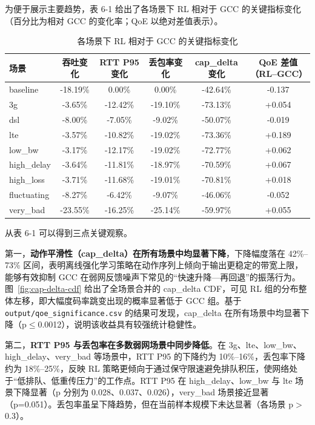 为便于展示主要趋势，表 6-1 给出了各场景下 RL 相对于 GCC 的关键指标变化（百分比为相对 GCC 的变化率；QoE 以绝对差值表示）。

\begin{table}[htbp]
    \centering
    \small
    \begin{tabular}{|l|c|c|c|c|c|}
        \hline
        场景 & 吞吐变化 & RTT P95 变化 & 丢包率变化 & cap\_delta 变化 & QoE 差值（RL--GCC） \\
        \hline
        baseline & -18.19\% & 0.00\% & 0.00\% & -42.64\% & -0.137 \\
        3g & -3.65\% & -12.42\% & -19.10\% & -73.13\% & +0.054 \\
        dsl & -8.00\% & -7.05\% & -9.02\% & -50.07\% & -0.019 \\
        lte & -3.57\% & -10.82\% & -19.02\% & -73.36\% & +0.189 \\
        low\_bw & -3.17\% & -12.17\% & -19.02\% & -72.77\% & +0.062 \\
        high\_delay & -3.64\% & -11.81\% & -18.97\% & -70.59\% & +0.067 \\
        high\_loss & -3.71\% & -11.68\% & -19.01\% & -70.81\% & +0.018 \\
        fluctuating & -8.27\% & -6.42\% & -9.07\% & -46.06\% & -0.052 \\
        very\_bad & -23.55\% & -16.25\% & -25.14\% & -59.97\% & +0.055 \\
        \hline
    \end{tabular}
    \caption{各场景下 RL 相对于 GCC 的关键指标变化}
    \label{tab:ab-delta-summary}
\end{table}

从表 6-1 可以得到三点关键观察。

第一，\textbf{动作平滑性（cap\_delta）在所有场景中均显著下降}，下降幅度落在 42\%--73\% 区间，表明离线强化学习策略在动作序列上倾向于输出更稳定的带宽上限，能够有效抑制 GCC 在弱网反馈噪声下常见的“快速升降—再回退”的振荡行为。图~\ref{fig:cap-delta-cdf} 给出了全场景合并的 cap\_delta CDF，可见 RL 组的分布整体左移，即大幅度码率跳变出现的概率显著低于 GCC 组。基于 \texttt{output/qoe\_significance.csv} 的结果可发现，cap\_delta 在所有场景中均显著下降（p$\le$0.0012），说明该收益具有较强统计稳健性。

第二，\textbf{RTT P95 与丢包率在多数弱网场景中同步降低}。在 3g、lte、low\_bw、high\_delay、very\_bad 等场景中，RTT P95 的下降约为 10\%--16\%，丢包率下降约为 18\%--25\%，反映 RL 策略更倾向于通过保守限速避免排队积压，使网络处于“低排队、低重传压力”的工作点。RTT P95 在 high\_delay、low\_bw 与 lte 场景下降显著（p 分别为 0.028、0.037、0.026），very\_bad 场景接近显著（p=0.051）。丢包率虽呈下降趋势，但在当前样本规模下未达显著（各场景 p$>$0.3）。

